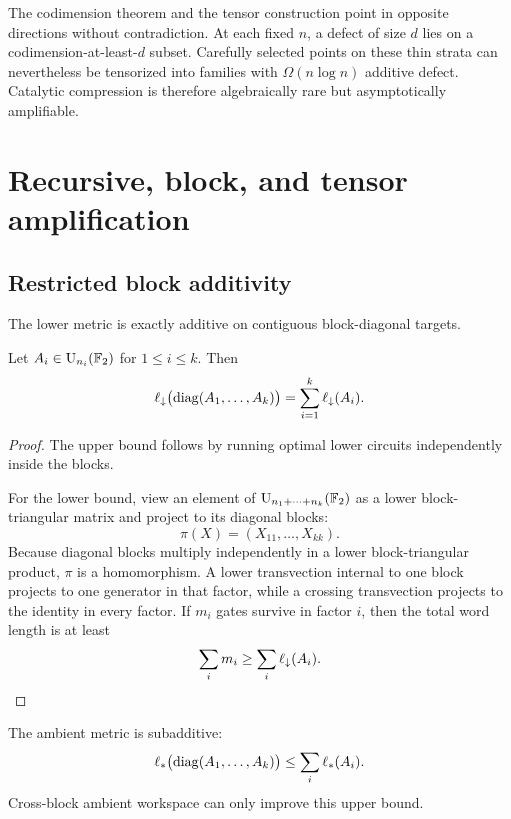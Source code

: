 \begin{remark}\label{g:rem:rare-amplifiable}
The codimension theorem and the tensor construction point in opposite directions without contradiction.  At each fixed $n$, a defect of size $d$ lies on a codimension-at-least-$d$ subset.  Carefully selected points on these thin strata can nevertheless be tensorized into families with $\Omega(n\log n)$ additive defect.  Catalytic compression is therefore algebraically rare but asymptotically amplifiable.
\end{remark}

\section{Recursive, block, and tensor amplification}\label{g:sec:amplification}

\subsection{Restricted block additivity}

The lower metric is exactly additive on contiguous block-diagonal targets.

\begin{proposition}\label{g:prop:block-additivity}
Let $A_i\in\operatorname{U}_{n_i}(\mathbb F_2)$ for $1\le i\le k$.  Then
\[
\ell_{\downarrow}\bigl(\operatorname{diag}(A_1,\ldots,A_k)\bigr)
=
\sum_{i=1}^k\ell_{\downarrow}(A_i).
\]
\end{proposition}

\begin{proof}
The upper bound follows by running optimal lower circuits independently inside the blocks.

For the lower bound, view an element of $\operatorname{U}_{n_1+\cdots+n_k}(\mathbb F_2)$ as a lower block-triangular matrix and project to its diagonal blocks:
\[
\pi(X)=(X_{11},\ldots,X_{kk}).
\]
Because diagonal blocks multiply independently in a lower block-triangular product, $\pi$ is a homomorphism.  A lower transvection internal to one block projects to one generator in that factor, while a crossing transvection projects to the identity in every factor.  If $m_i$ gates survive in factor $i$, then the total word length is at least
\[
\sum_i m_i
\ge
\sum_i\ell_{\downarrow}(A_i).
\]
\end{proof}

The ambient metric is subadditive:
\[
\ell_{*}\bigl(\operatorname{diag}(A_1,\ldots,A_k)\bigr)
\le
\sum_i\ell_{*}(A_i).
\]
Cross-block ambient workspace can only improve this upper bound.

